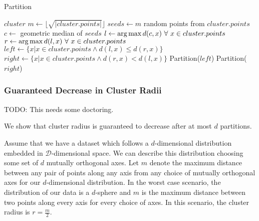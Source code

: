 \begin{algorithm} %
\caption{Partition} %
\label{alg:partition} %
\begin{algorithmic}[1] %
    \REQUIRE $cluster$
    \STATE $m \leftarrow \lfloor \sqrt{|cluster.points|} \rfloor$
    \STATE $seeds \leftarrow m$ random points from $cluster.points$
    \STATE $c \leftarrow$ geometric median of $seeds$
    \STATE $l \leftarrow \operatorname*{arg\,max} d(c,x) \ \forall \ x \in cluster.points$
    \STATE $r \leftarrow \operatorname*{arg\,max} d(l,x) \ \forall \ x \in cluster.points$
    \STATE $left \leftarrow \{x | x \in cluster.points \land d(l,x) \le d(r,x)\}$
    \STATE $right \leftarrow \{x | x \in cluster.points \land d(r,x) < d(l,x)\}$
        \STATE Partition($left$)
    \ENDIF
        \STATE Partition($right$)
    \ENDIF
\end{algorithmic}
\end{algorithm}

\subsubsection {Guaranteed Decrease in Cluster Radii}
\label{subsubsec:methods:guaranteed-decrease-in-cluster-radii}

TODO: This needs some doctoring. 

We show that cluster radius is guaranteed to decrease after at most $d$ partitions.

Assume that we have a dataset which follows a $d$-dimensional distribution embedded in $\mathcal{D}$-dimensional space.
We can describe this distribution choosing some set of $d$ mutually orthogonal axes.
Let $m$ denote the maximum distance between any pair of points along any axis from any choice of mutually orthogonal axes for our $d$-dimensional distribution.
In the worst case scenario, the distribution of our data is a $d$-sphere and $m$ is the maximum distance between two points along every axis for every choice of axes.
In this scenario, the cluster radius is $r = \frac{m}{2}$.

